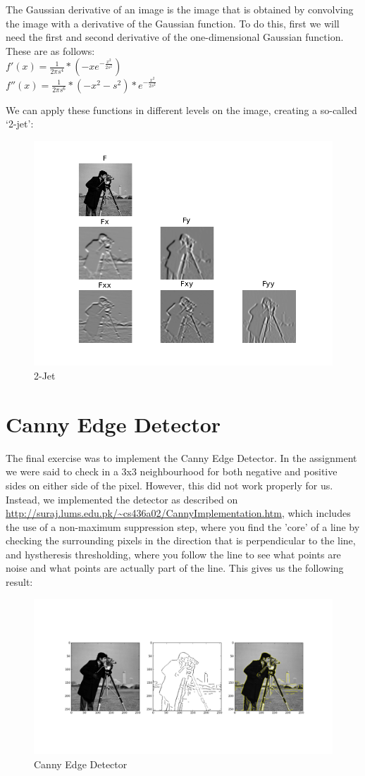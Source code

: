 \documentclass[10pt,a4paper]{article}
\begin{document}
The Gaussian derivative of an image is the image that is obtained by
convolving the image with a derivative of the Gaussian function. To do this,
first we will need the first and second derivative of the one-dimensional
Gaussian function. These are as follows:\\
$f'(x) = \frac{1}{2\pi s^4} * (-xe^{-\frac{x^2}{2s^2}})$\\
$f''(x) = \frac{1}{2\pi s^6} * (-x^2 - s^2) * e^{-\frac{x^2}{2s^2}}$

We can apply these functions in different levels on the image, creating a
so-called `2-jet':
\begin{figure}[H]
	\includegraphics[scale=0.3]{jet.png}
	\caption{2-Jet}
\end{figure}

\section{Canny Edge Detector}

The final exercise was to implement the Canny Edge Detector. In the assignment we
were said to check in a 3x3 neighbourhood for both negative and positive sides on
either side of the pixel. However, this did not work properly for us. Instead, we
implemented the detector as described on 
\url{http://suraj.lums.edu.pk/~cs436a02/CannyImplementation.htm}, which includes
the use of a non-maximum suppression step, where you find the 'core' of a line by
checking the surrounding pixels in the direction that is perpendicular to the line,
and hystheresis thresholding, where you follow the line to see what points are noise
and what points are actually part of the line. This gives us the following result:\\

\begin{figure}[H]
	\includegraphics[scale=0.3]{canny.png}
	\caption{Canny Edge Detector}
\end{figure}
\end{document}
